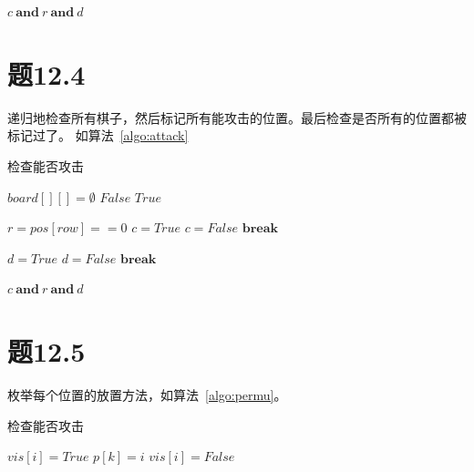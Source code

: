\documentclass[a4paper,twoside]{article}
\begin{document}
\begin{spacing}{1.2}
\begin{algorithm}[htbp]
\begin{algorithmic}[1]
			\State \Return $c \ \mathbf{and} \ r \ \mathbf{and} \ d$
		\EndProcedure
	\end{algorithmic}
\end{algorithm}	

\section{题12.4}

递归地检查所有棋子，然后标记所有能攻击的位置。最后检查是否所有的位置都被标记过了。
如算法~\ref{algo:attack}
\begin{algorithm}[htbp]
	\caption{检查能否攻击}
	\label{algo:attack}
	\begin{algorithmic}[1]
			\State $board[][]=\emptyset$
			\State {}
						\State \Return $False$
					\EndIf
				\EndFor
			\EndFor
			\State \Return $True$
		\EndProcedure

			\State $r=pos[row]==0$	
			\State $c=True$
					\State $c=False$
					\State $\mathbf{break}$
				\EndIf
			\EndFor	

			\State $d=True$
							\State $d=False$
							\State $\mathbf{break}$
						\EndIf
					\EndIf
				\EndFor
			\EndFor

			\State \Return $c \ \mathbf{and} \ r \ \mathbf{and} \ d$
		\EndProcedure
	\end{algorithmic}
\end{algorithm}	

\section{题12.5}

枚举每个位置的放置方法，如算法~\ref{algo:permu}。

\begin{algorithm}[htbp]
	\caption{检查能否攻击}
	\label{algo:permu}
	\begin{algorithmic}[1]
				\State {}
			\EndIf
					\State $vis[i]=True$
					\State $p[k]=i$
					\State {}
					\State $vis[i]=False$
				\EndIf
			\EndFor
		\EndProcedure
	\end{algorithmic}
\end{algorithm}	


\end{spacing}
\end{document}
